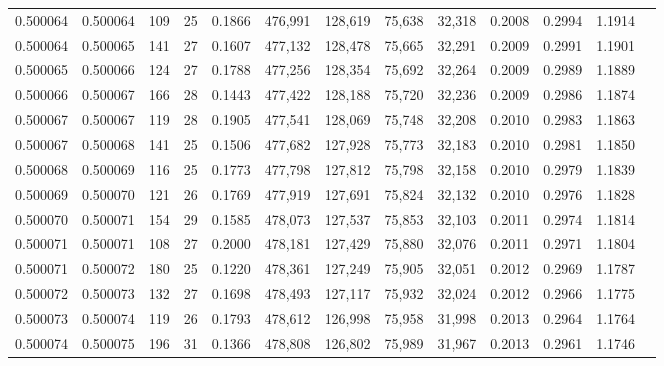 \begin{tabular}{rrrrrrrrrrrrr}
0.500064 & 0.500064 & 109 &  25 &                                     0.1866 & 476,991 & 128,619 &  75,638 &  32,318 & 0.2008 & 0.2994 & 1.1914 \\
0.500064 & 0.500065 & 141 &  27 &                                     0.1607 & 477,132 & 128,478 &  75,665 &  32,291 & 0.2009 & 0.2991 & 1.1901 \\
0.500065 & 0.500066 & 124 &  27 &                                     0.1788 & 477,256 & 128,354 &  75,692 &  32,264 & 0.2009 & 0.2989 & 1.1889 \\
0.500066 & 0.500067 & 166 &  28 &                                     0.1443 & 477,422 & 128,188 &  75,720 &  32,236 & 0.2009 & 0.2986 & 1.1874 \\
0.500067 & 0.500067 & 119 &  28 &                                     0.1905 & 477,541 & 128,069 &  75,748 &  32,208 & 0.2010 & 0.2983 & 1.1863 \\
0.500067 & 0.500068 & 141 &  25 &                                     0.1506 & 477,682 & 127,928 &  75,773 &  32,183 & 0.2010 & 0.2981 & 1.1850 \\
0.500068 & 0.500069 & 116 &  25 &                                     0.1773 & 477,798 & 127,812 &  75,798 &  32,158 & 0.2010 & 0.2979 & 1.1839 \\
0.500069 & 0.500070 & 121 &  26 &                                     0.1769 & 477,919 & 127,691 &  75,824 &  32,132 & 0.2010 & 0.2976 & 1.1828 \\
0.500070 & 0.500071 & 154 &  29 &                                     0.1585 & 478,073 & 127,537 &  75,853 &  32,103 & 0.2011 & 0.2974 & 1.1814 \\
0.500071 & 0.500071 & 108 &  27 &                                     0.2000 & 478,181 & 127,429 &  75,880 &  32,076 & 0.2011 & 0.2971 & 1.1804 \\
0.500071 & 0.500072 & 180 &  25 &                                     0.1220 & 478,361 & 127,249 &  75,905 &  32,051 & 0.2012 & 0.2969 & 1.1787 \\
0.500072 & 0.500073 & 132 &  27 &                                     0.1698 & 478,493 & 127,117 &  75,932 &  32,024 & 0.2012 & 0.2966 & 1.1775 \\
0.500073 & 0.500074 & 119 &  26 &                                     0.1793 & 478,612 & 126,998 &  75,958 &  31,998 & 0.2013 & 0.2964 & 1.1764 \\
0.500074 & 0.500075 & 196 &  31 &                                     0.1366 & 478,808 & 126,802 &  75,989 &  31,967 & 0.2013 & 0.2961 & 1.1746 \\

\end{tabular}
